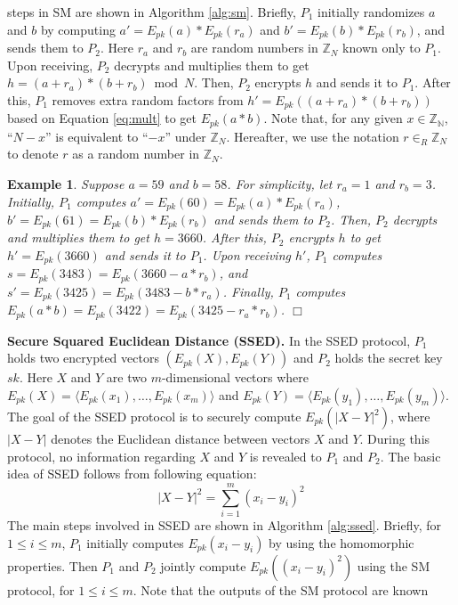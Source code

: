 \documentclass{article}
\newtheorem{example}{Example}
\begin{document}
steps in SM are shown in Algorithm \ref{alg:sm}. Briefly, $P_1$ initially 
randomizes $a$ and $b$ by computing $a' = E_{pk}(a)*E_{pk}(r_a)$ and $b' = E_{pk}(b)*E_{pk}(r_b)$, and 
sends them to $P_2$. Here $r_a$ and $r_b$ are random numbers in $\mathbb{Z}_N$ known only to $P_1$. 
Upon receiving, $P_2$ decrypts and multiplies them to get $h = (a+r_a)\ast(b+r_b) \bmod N$. 
Then, $P_2$ encrypts $h$ and sends it to $P_1$. After this, $P_1$ removes extra random factors 
from $h' = E_{pk}((a+r_a)*(b+r_b))$ based on Equation \ref{eq:mult} to get $E_{pk}(a*b)$. 
Note that, for any given $x\in \mathbb{Z_N}$,  ``$N-x$'' is equivalent to ``$-x$'' under $\mathbb{Z}_N$. 
Hereafter, we use the notation $r \in_R \mathbb{Z}_N$ to denote $r$ as a random number in $\mathbb{Z}_N$.
\begin{example} Suppose $a = 59$ and $b = 58$. For simplicity, let $r_a = 1$ and $r_b = 3$. Initially, 
$P_1$ computes $a'= E_{pk}(60) = E_{pk}(a)*E_{pk}(r_a)$, $b' =E_{pk}(61) = E_{pk}(b)*E_{pk}(r_b)$ and 
sends them to $P_2$. Then, $P_2$ decrypts  
and multiplies them to get $h= 3660$. After this, $P_2$ encrypts $h$ to get $h'= E_{pk}(3660)$ and sends it to $P_1$. 
Upon receiving $h'$, $P_1$ computes $s = E_{pk}(3483)  = E_{pk}(3660 - a \ast r_b)$, and 
$s'= E_{pk}(3425) = E_{pk}(3483 - b \ast r_a)$. Finally, $P_1$ computes 
$E_{pk}(a \ast b) = E_{pk}(3422) = E_{pk}(3425 - r_a \ast r_b)$.
\hfill $\Box$\\
\end{example}
\noindent \textbf{Secure Squared Euclidean Distance (SSED). }
In the SSED protocol, $P_1$ holds two encrypted vectors $(E_{pk}(X), E_{pk}(Y))$ and 
$P_2$ holds the secret key $sk$. Here $X$ and $Y$ are two $m$-dimensional vectors 
where $E_{pk}(X) = \langle E_{pk}(x_1), \ldots, E_{pk}(x_m)\rangle$ and 
$E_{pk}(Y) = \langle E_{pk}(y_1),\ldots, E_{pk}(y_m)\rangle$. The goal 
of the SSED protocol is to securely compute $E_{pk}(|X-Y|^2)$, where $|X-Y|$ denotes 
the Euclidean distance between vectors $X$ and $Y$. During this protocol, no information regarding 
$X$ and $Y$ is revealed to $P_1$ and $P_2$. 
The basic idea of SSED follows from 
following equation:
\begin{equation}\label{eq:euclidean}
|X-Y|^2 = \sum_{i=1}^m (x_i - y_i)^2 
\end{equation}
The main steps involved in SSED are shown in  Algorithm \ref{alg:ssed}. Briefly, for $1 \le i \le m$, $P_1$ initially 
computes $E_{pk}(x_i-y_i)$  by using the homomorphic properties. Then $P_1$ and $P_2$ jointly compute 
$E_{pk}((x_i-y_i)^2)$ using the SM protocol, for $1 \le i \le m$. Note that the outputs of the SM protocol are known 
\end{document}
